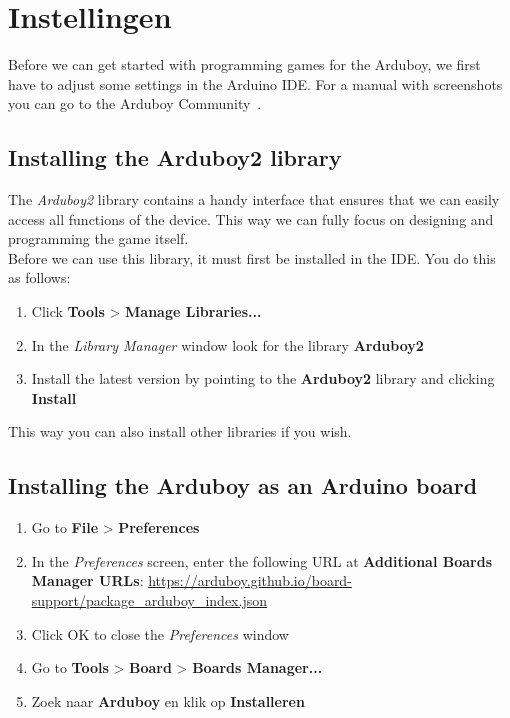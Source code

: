 \documentclass[11pt,fleqn]{book} %
\begin{document}
\section{Instellingen}
\label{sec:arduboy-instellingen}

Before we can get started with programming games for the Arduboy, we first have to adjust some settings in the Arduino IDE. For a manual with screenshots you can go to the Arduboy Community~\cite{arduboy:tuto1}.

\subsection{Installing the Arduboy2 library}
The \emph{Arduboy2} library contains a handy interface that ensures that we can easily access all functions of the device. This way we can fully focus on designing and programming the game itself.\\

\noindent
Before we can use this library, it must first be installed in the IDE. You do this as follows:

\begin{enumerate}
	\item Click \textbf{Tools} > \textbf{Manage Libraries...}
	\item In the \emph{Library Manager} window look for the library \textbf{Arduboy2}
	\item Install the latest version by pointing to the \textbf{Arduboy2} library and clicking \textbf{Install}
\end{enumerate}
This way you can also install other libraries if you wish.

\subsection{Installing the Arduboy as an Arduino board}
\begin{enumerate}
	\item Go to \textbf{File} > \textbf{Preferences}
	\item In the \emph{Preferences} screen, enter the following URL at \textbf{Additional Boards Manager URLs}: \url{https://arduboy.github.io/board-support/package_arduboy_index.json}
	\item Click OK to close the \emph{Preferences} window
	\item Go to \textbf{Tools} > \textbf{Board} > \textbf{Boards Manager...}
	\item Zoek naar \textbf{Arduboy} en klik op \textbf{Installeren}
\end{enumerate}
\end{document}
